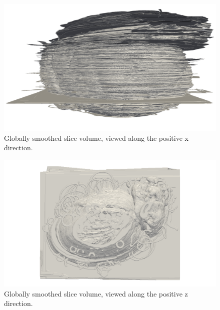     \begin{figure}
      \centering
      \includegraphics[width=0.9\textheight]{Ch6/Figs/Rat28/contours/whole_positive_x_diffused}
      \caption{Globally smoothed slice volume, viewed along the positive x direction.}
      \label{fig:whole_positive_x_diffused}
    \end{figure}

    \begin{figure}
      \centering
      \includegraphics[width=0.9\textheight]{Ch6/Figs/Rat28/contours/whole_positive_z_diffused}
      \caption{Globally smoothed slice volume, viewed along the positive z direction.}
      \label{fig:whole_positive_z_diffused}
    \end{figure}
  
